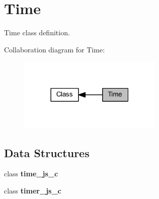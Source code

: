 \section{Time}
\label{group___time}


Time class definition.  


Collaboration diagram for Time\+:
\nopagebreak
\begin{figure}[H]
\begin{center}
\leavevmode
\includegraphics[width=195pt]{group___time}
\end{center}
\end{figure}
\subsection*{Data Structures}
\begin{DoxyCompactItemize}
\item 
class \textbf{ time\+\_\+js\+\_\+c}
\item 
class \textbf{ timer\+\_\+js\+\_\+c}
\end{DoxyCompactItemize}
